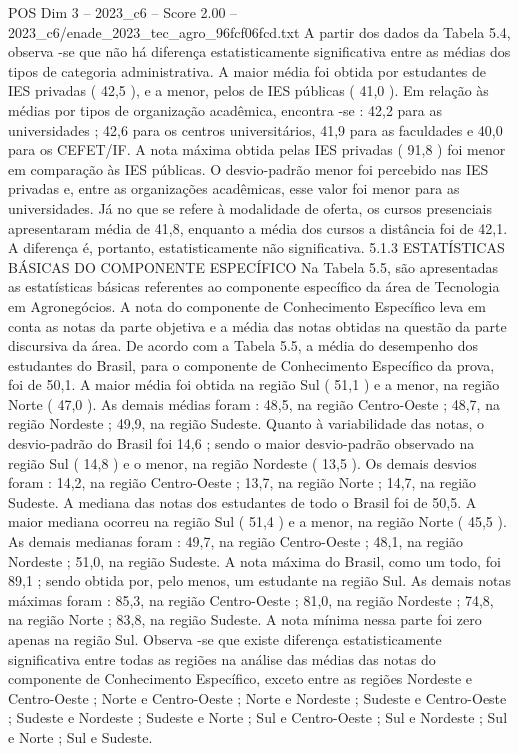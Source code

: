 \begin{textsample}{POS Dim 3 – 2023\_c6 – Score 2.00 – 2023\_c6/enade\_2023\_tec\_agro\_96fcf06fcd.txt}
A partir dos dados da Tabela 5.4, observa -se que não há diferença estatisticamente significativa entre as médias dos tipos de categoria administrativa.
A maior média foi obtida por estudantes de IES privadas ( 42,5 ), e a menor, pelos de IES públicas ( 41,0 ).
Em relação às médias por tipos de organização acadêmica, encontra -se : 42,2 para as universidades ; 42,6 para os centros universitários, 41,9 para as faculdades e 40,0 para os CEFET/IF.
A nota máxima obtida pelas IES privadas ( 91,8 ) foi menor em comparação às IES públicas.
O desvio-padrão menor foi percebido nas IES privadas e, entre as organizações acadêmicas, esse valor foi menor para as universidades.
Já no que se refere à modalidade de oferta, os cursos presenciais apresentaram média de 41,8, enquanto a média dos cursos a distância foi de 42,1.
A diferença é, portanto, estatisticamente não significativa. 5.1.3 ESTATÍSTICAS BÁSICAS DO COMPONENTE ESPECÍFICO Na Tabela 5.5, são apresentadas as estatísticas básicas referentes ao componente específico da área de Tecnologia em Agronegócios.
A nota do componente de Conhecimento Específico leva em conta as notas da parte objetiva e a média das notas obtidas na questão da parte discursiva da área.
De acordo com a Tabela 5.5, a média do desempenho dos estudantes do Brasil, para o componente de Conhecimento Específico da prova, foi de 50,1.
A maior média foi obtida na região Sul ( 51,1 ) e a menor, na região Norte ( 47,0 ).
As demais médias foram : 48,5, na região Centro-Oeste ; 48,7, na região Nordeste ; 49,9, na região Sudeste.
Quanto à variabilidade das notas, o desvio-padrão do Brasil foi 14,6 ; sendo o maior desvio-padrão observado na região Sul ( 14,8 ) e o menor, na região Nordeste ( 13,5 ).
Os demais desvios foram : 14,2, na região Centro-Oeste ; 13,7, na região Norte ; 14,7, na região Sudeste.
A mediana das notas dos estudantes de todo o Brasil foi de 50,5.
A maior mediana ocorreu na região Sul ( 51,4 ) e a menor, na região Norte ( 45,5 ).
As demais medianas foram : 49,7, na região Centro-Oeste ; 48,1, na região Nordeste ; 51,0, na região Sudeste.
A nota máxima do Brasil, como um todo, foi 89,1 ; sendo obtida por, pelo menos, um estudante na região Sul.
As demais notas máximas foram : 85,3, na região Centro-Oeste ; 81,0, na região Nordeste ; 74,8, na região Norte ; 83,8, na região Sudeste.
A nota mínima nessa parte foi zero apenas na região Sul.
Observa -se que existe diferença estatisticamente significativa entre todas as regiões na análise das médias das notas do componente de Conhecimento Específico, exceto entre as regiões Nordeste e Centro-Oeste ; Norte e Centro-Oeste ; Norte e Nordeste ; Sudeste e Centro-Oeste ; Sudeste e Nordeste ; Sudeste e Norte ; Sul e Centro-Oeste ; Sul e Nordeste ; Sul e Norte ; Sul e Sudeste.

\end{textsample}
